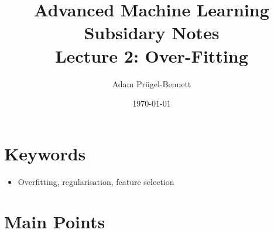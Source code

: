 \documentclass[11pt]{article}
\author{Adam Prügel-Bennett}
\date{\today}
\title{Advanced Machine Learning Subsidary Notes\\\medskip
\large Lecture 2: Over-Fitting}
\begin{document}
\maketitle


\section{Keywords}
\label{sec:org50244e5}
\begin{itemize}
\item Overfitting, regularisation, feature selection
\end{itemize}

\section{Main Points}
\label{sec:orgeb4ce70}
\end{document}
